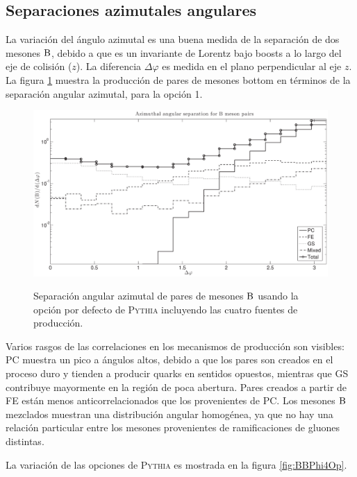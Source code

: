 \subsection{Separaciones azimutales angulares}

La variación del ángulo azimutal es una buena medida de la separación de dos mesones $\B$, debido a que es un invariante de Lorentz bajo boosts a lo largo del eje de colisión ($z$). La diferencia $\Delta \varphi$  es medida en el plano perpendicular al eje $z$. La figura \ref{fig:BBPhiOp1}  muestra la producción de pares de mesones bottom en términos de la separación angular azimutal, para la opción 1.

\begin{figure}[!h]
\centering
\caption[Separación angular azimutal de pares de mesones $\B$. Opción por defecto de \textsc{Pythia}.]{Separación angular azimutal de pares de mesones $\B$ usando la opción por defecto de \textsc{Pythia} incluyendo las cuatro fuentes de producción.}
\includegraphics[width=15cm]{BBPhiOp1}
\label{fig:BBPhiOp1}
\end{figure}
Varios rasgos de las correlaciones en los mecanismos de producción son visibles: PC muestra un pico a ángulos altos, debido a que los pares son creados en el proceso duro y tienden a producir quarks en sentidos opuestos, mientras que GS contribuye mayormente en la región de poca abertura. Pares creados a partir de FE están menos anticorrelacionados que los provenientes de PC. Los mesones $\B$ mezclados muestran una distribución angular homogénea, ya que no hay una relación particular entre los mesones provenientes de ramificaciones de gluones distintas.

La variación de las opciones de \textsc{Pythia} es mostrada en la figura \ref{fig:BBPhi4Op}.

